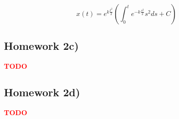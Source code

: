 \documentclass[]{scrartcl}
\begin{document}
$$
x(t) = e^{k\frac{t^2}{2}} \left( \int_{0}^{t} e^{-k\frac{s^2}{2}} s^2 ds + C \right)
$$



\subsection*{Homework 2c)}

\textbf{\textcolor{red}{TODO}}


\subsection*{Homework 2d)}

\textbf{\textcolor{red}{TODO}}
\end{document}
